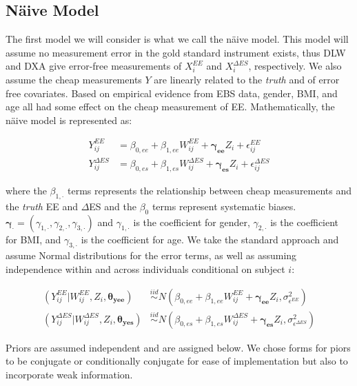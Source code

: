\documentclass[11pt]{article}\usepackage[]{graphicx}\usepackage[]{color}
\begin{document}
\subsection{N{\"a}ive Model}

The first model we will consider is what we call the n{\"a}ive model. This model will assume no measurement error in the gold standard instrument exists,  thus DLW and DXA give error-free measurements of $X_i^{EE}$ and $X_i^{\Delta ES}$, respectively. We also assume the cheap measurements $Y$ are linearly related to  the \emph{truth} and of error free covariates. Based on empirical evidence from EBS data, gender, BMI, and age all had some effect on the cheap measurement of EE.  Mathematically, the n{\"a}ive model is represented as:

\begin{align}
Y_{ij}^{EE} &= \beta_{0,ee} + \beta_{1,ee}W_{ij}^{EE}+ \boldsymbol{\gamma_{ee}}Z_i + \epsilon_{ij}^{EE} \\
Y_{ij}^{\Delta ES} &= \beta_{0,es} + \beta_{1,es}W_{ij}^{\Delta ES}+ \boldsymbol{\gamma_{es}}Z_i + \epsilon_{ij}^{\Delta ES} 
\end{align}

where the $\beta_{1,\cdot}$ terms represents the relationship between cheap measurements and the \emph{truth} EE and $\Delta$ES and the $\beta_0$ terms represent systematic biases. $\boldsymbol{\gamma_{\cdot}}=(\gamma_{1,\cdot},\gamma_{2,\cdot},\gamma_{3,\cdot})$ and $\gamma_{1,\cdot}$ is the coefficient for gender, $\gamma_{2,\cdot}$ is the coefficient for BMI, and $\gamma_{3,\cdot}$ is the coefficient for age. We take the standard approach and assume Normal distributions for the error terms, as well as assuming independence within and across individuals conditional on subject $i$:

\begin{align}
  \label{ymodel0}
  (Y_{ij}^{EE} | W_{ij}^{EE},Z_i,\boldsymbol{\theta_{yee}}) &\overset{iid}{\sim} N(\beta_{0,ee} + \beta_{1,ee}W_{ij}^{EE}+ \boldsymbol{\gamma_{ee}}Z_i,\sigma_{\epsilon^{EE}}^2) \\
  \label{ymodel0b}
  (Y_{ij}^{\Delta ES} | W_{ij}^{\Delta ES},Z_i,\boldsymbol{\theta_{yes}}) &\overset{iid}{\sim} N(\beta_{0,es} + \beta_{1,es}W_{ij}^{\Delta ES}+ \boldsymbol{\gamma_{es}}Z_i,\sigma_{\epsilon^{\Delta ES}}^2)
\end{align}

Priors are assumed independent and are assigned below. We chose forms for piors to be conjugate or conditionally conjugate for ease of implementation but also to incorporate weak information. 
\end{document}
